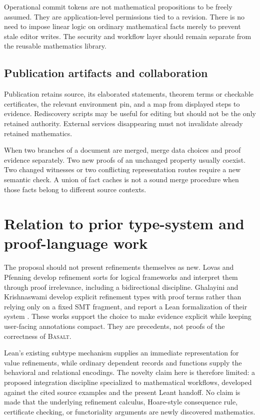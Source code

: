 \documentclass[11pt,a4paper]{article}
\newcommand{\Basalt}{\textsc{Basalt}}
\theoremstyle{plain}
\theoremstyle{definition}
\theoremstyle{remark}
\begin{document}
Operational commit tokens are not mathematical propositions to be freely
assumed. They are application-level permissions tied to a revision. There is
no need to impose linear logic on ordinary mathematical facts merely to
prevent stale editor writes. The security and workflow layer should remain
separate from the reusable mathematics library.

\subsection{Publication artifacts and collaboration}
Publication retains source, its elaborated statements, theorem terms or
checkable certificates, the relevant environment pin, and a map from displayed
steps to evidence. Rediscovery scripts may be useful for editing but should
not be the only retained authority. External services disappearing must not
invalidate already retained mathematics.

When two branches of a document are merged, merge data choices and proof
evidence separately. Two new proofs of an unchanged property usually coexist.
Two changed witnesses or two conflicting representation routes require a new
semantic check. A union of fact caches is not a sound merge procedure when
those facts belong to different source contexts.

\section{Relation to prior type-system and proof-language work}
\label{sec:prior}
The proposal should not present refinements themselves as new. Lovas and
Pfenning develop refinement sorts for logical frameworks and interpret them
through proof irrelevance, including a bidirectional discipline. Ghalayini
and Krishnaswami develop explicit refinement types with proof terms rather
than relying only on a fixed SMT fragment, and report a Lean formalization of
their system \cite{lovaspfenning,explicitrefinements}. These works support the
choice to make evidence explicit while keeping user-facing annotations compact.
They are precedents, not proofs of the correctness of \Basalt.

Lean's existing subtype mechanism supplies an immediate representation for
value refinements, while ordinary dependent records and functions supply the
behavioral and relational encodings. The novelty claim here is therefore
limited: a proposed integration discipline specialized to mathematical
workflows, developed against the cited source examples and the present Leant
handoff. No claim is made that the underlying refinement calculus, Hoare-style
consequence rule, certificate checking, or functoriality arguments are newly
discovered mathematics.
\end{document}
